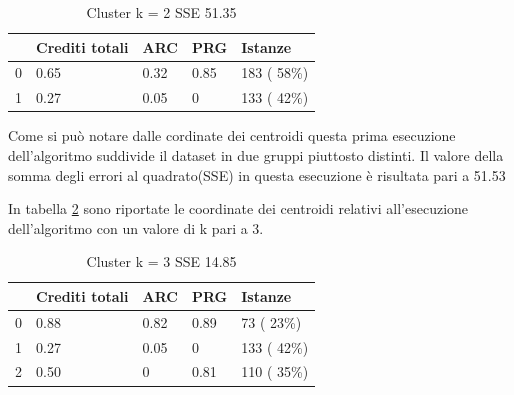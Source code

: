 \documentclass[12pt]{article}
\begin{document}

\begin{table}[ht]
	\centering
	\caption{Cluster k = 2 SSE 51.35}
	\label{c2AP}
	\begin{tabular}{@{}lllll@{}}
	\toprule
	  & Crediti totali & ARC  & PRG  & Istanze\\ \midrule
	0 & 0.65           & 0.32 & 0.85 & 183 ( 58\%)\\
	1 & 0.27           & 0.05 & 0    & 133 ( 42\%)\\ \bottomrule
	\end{tabular}
\end{table}

Come si può notare dalle cordinate dei centroidi questa prima esecuzione dell'algoritmo suddivide il dataset in due gruppi piuttosto distinti.
Il valore della somma degli errori al quadrato(SSE) in questa esecuzione è risultata pari a 51.53

In tabella \ref{c3AP} sono riportate le coordinate dei centroidi relativi all'esecuzione dell'algoritmo con un valore di k pari a 3.
\begin{table}[ht]
	\centering
	\caption{Cluster k = 3 SSE 14.85}
	\label{c3AP}
	\begin{tabular}{@{}lllll@{}}
	\toprule
	  & Crediti totali & ARC  & PRG  & Istanze\\ \midrule
	0 & 0.88           & 0.82 & 0.89 & 73 ( 23\%)\\
	1 & 0.27           & 0.05 & 0    & 133 ( 42\%)\\
	2 & 0.50           & 0    & 0.81 & 110 ( 35\%)\\ \bottomrule
	\end{tabular}
\end{table}
\end{document}
